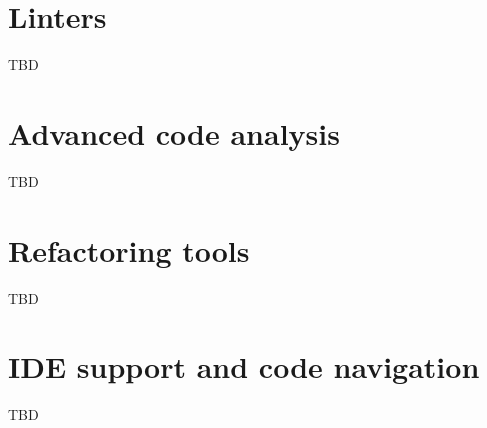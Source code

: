 \chapter{Linters}
TBD

\chapter{Advanced code analysis}
TBD

\chapter{Refactoring tools}
TBD

\chapter{IDE support and code navigation}
TBD
